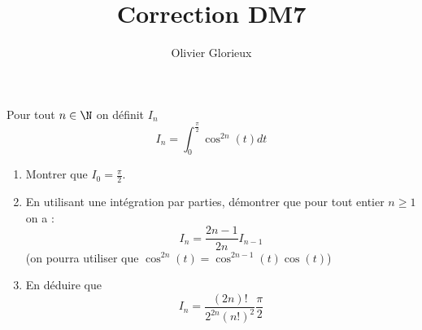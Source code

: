 \documentclass[a4paper, 11pt,reqno]{article}
\author{Olivier Glorieux}
\begin{document}
\title{Correction DM7 
}








%
%
%
\begin{exercice}
Pour tout $n\in \N$ on définit $I_n$ 
$$I_n = \int_0^{\frac{\pi}{2}} \cos^{2n}(t) dt $$
\begin{enumerate}
\item Montrer que $I_0= \frac{\pi}{2}$.
\item En utilisant une intégration par parties, démontrer que pour tout entier $n\geq 1$ on a :
$$I_n =\frac{2n-1}{2n} I_{n-1}$$
(on pourra utiliser que $\cos^{2n}(t)=\cos^{2n-1}(t)\cos(t)$)
\item En déduire que 
$$I_n = \frac{(2n)! }{2^{2n} (n!)^2} \frac{\pi}{2}$$
\end{enumerate}
\end{exercice}
\end{document}
